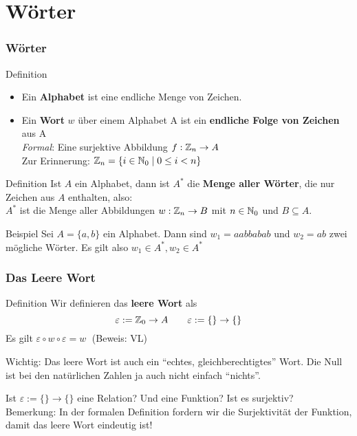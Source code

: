 \section{Wörter}

\begin{frame}
	\frametitle{Wörter}
	\begin{block}{Definition}
		\begin{itemize}
			\item Ein \textbf{Alphabet} ist eine endliche Menge von Zeichen. \pause
			\item Ein \textbf{Wort} $w$  über einem Alphabet A ist ein \textbf{endliche Folge von Zeichen} aus A \\ \pause
				\emph{Formal}: Eine surjektive Abbildung $f : \mathbb{Z}_n \to A$\\[0.5em]
				Zur Erinnerung: $ \mathbb{Z}_n = \{i\in \mathbb{N}_0 \mid 0 \leq i < n \} $ 
		\end{itemize}
	\end{block}	

	\pause
	\begin{block}{Definition}
		Ist $A$ ein Alphabet, dann ist $A^*$ die \textbf{Menge aller Wörter}, die nur Zeichen aus $A$ enthalten, also:\\
		\pause 
		$A^*$ ist die Menge aller Abbildungen $w: \mathbb{Z}_n \to B$ mit $n \in \mathbb{N}_0$ und $B \subseteq A$. \\
	\end{block}

	\pause
	\begin{block}{Beispiel}
		Sei $ A = \{ a,b\} $ ein Alphabet. 
		Dann sind $ w_1 = aabbabab$ und $w_2 = ab $ zwei mögliche Wörter.
		Es gilt also $ w_1 \in A^*, w_2 \in A^*$
	\end{block}

\end{frame}

\begin{frame}
	\frametitle{Das Leere Wort}
	\begin{block}{Definition}
		Wir definieren das \textbf{leere Wort} als $$ \varepsilon := \mathbb{Z}_0  \to A \qquad \varepsilon := \{\} \to \{\}$$ \pause
		Es gilt $ \varepsilon \circ w \circ \varepsilon = w \;$ (Beweis: VL) \\[1em] \pause
		
		Wichtig: Das leere Wort ist auch ein \enquote{echtes, gleichberechtigtes} Wort. Die Null ist bei den natürlichen Zahlen ja auch nicht einfach \enquote{nichts}. \\[1em] \pause
		
		Ist $\varepsilon := \{\} \to \{\}$ eine Relation? Und eine Funktion? Ist es surjektiv? \\ \pause
		Bemerkung: In der formalen Definition fordern wir die Surjektivität der Funktion, damit das leere Wort eindeutig ist!
	\end{block}
	
\end{frame}


